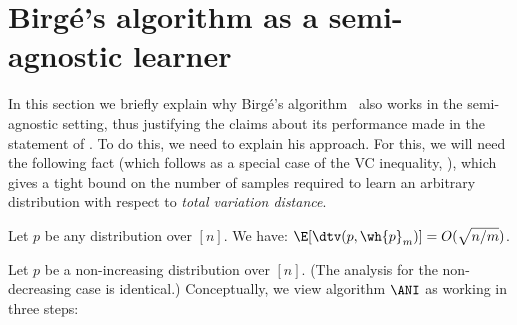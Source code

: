 \appendix

%

\section{Birg{\'e}'s algorithm as a semi-agnostic learner}
\label{sec:birge-agnostic}

In this section we briefly explain why Birg{\'e}'s algorithm~\cite{Birge:87b}
also works in the semi-agnostic setting,
{thus justifying the claims about its performance made in the
statement of .}
To do this, we need to explain
his approach. For this, we will need the following {fact (which follows as a special case of the VC inequality, {}}), 
which gives
a tight bound on the number of samples required to
learn an arbitrary distribution with respect to \emph{total variation distance}.

\begin{fact} \label{thm:folklore}
Let $p$ be any distribution over $[n]$. We have: $\E [ \dtv ( p, \wh{p}_m) ]  =  O( \sqrt{n/m})$.
\end{fact}


Let $p$ be a non-increasing distribution over $[n]$.
(The analysis for the non-decreasing case is identical.)
Conceptually, we view algorithm $\ANI$ as working in three steps:

